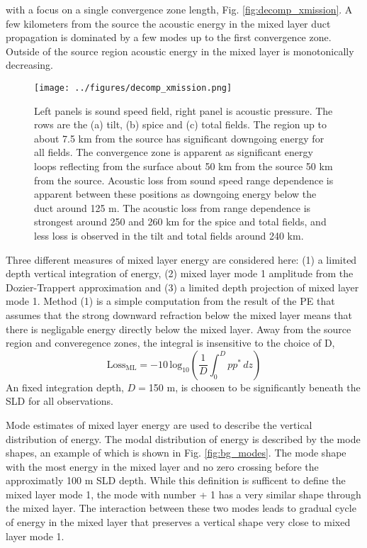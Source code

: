 \documentclass[preprint,NumberedRefs]{JASA}
\begin{document}
with a focus on a single convergence zone length, Fig. \ref{fig:decomp_xmission}. A few kilometers from the source the acoustic energy in the mixed layer duct propagation is dominated by a few modes up to the first convergence zone. Outside of the source region acoustic energy in the mixed layer is monotonically decreasing.
\begin{figure}
\texttt{[image: ../figures/decomp\_xmission.png]}
    \caption{\label{fig:decomp_x}{Left panels is sound speed field, right panel is acoustic pressure. The rows are the (a) tilt, (b) spice and (c) total fields. The region up to about 7.5 km from the source has significant downgoing energy for all fields. The convergence zone is apparent as significant energy loops reflecting from the surface about 50 km from the source 50 km from the source. Acoustic loss from sound speed range dependence is apparent between these positions as downgoing energy below the duct around 125 m. The acoustic loss from range dependence is strongest around 250 and 260 km for the spice and total fields, and less loss is observed in the tilt and total fields around 240 km.}}
\end{figure}

Three different measures of mixed layer energy are considered here: (1) a limited depth vertical integration of energy, (2) mixed layer mode 1 amplitude from the Dozier-Trappert approximation and (3) a limited depth projection of mixed layer mode 1. Method (1) is a simple computation from the result of the PE that assumes that the strong downward refraction below the mixed layer means that there is negligable energy directly below the mixed layer. Away from the source region and converegence zones, the integral is insensitive to the choice of D,
\begin{equation}
    \textrm{Loss}_{\textrm{ML}} = -10 \, \textrm{log}_{10} \left( \frac{1}{D} \int^{D}_0 p p^* \,  dz \right)
\end{equation}
An fixed integration depth, $D=$150 m, is choosen to be significantly beneath the SLD for all observations.

Mode estimates of mixed layer energy are used to describe the vertical distribution of energy. The modal distribution of energy is described by the mode shapes, an example of which is shown in Fig. \ref{fig:bg_modes}. The mode shape with the most energy in the mixed layer and no zero crossing before the approximatly 100 m SLD depth. While this definition is sufficent to define the mixed layer mode 1, the mode with number + 1 has a very similar shape through the mixed layer. The interaction between these two modes leads to gradual cycle of energy in the mixed layer that preserves a vertical shape very close to mixed layer mode 1.
\end{document}
